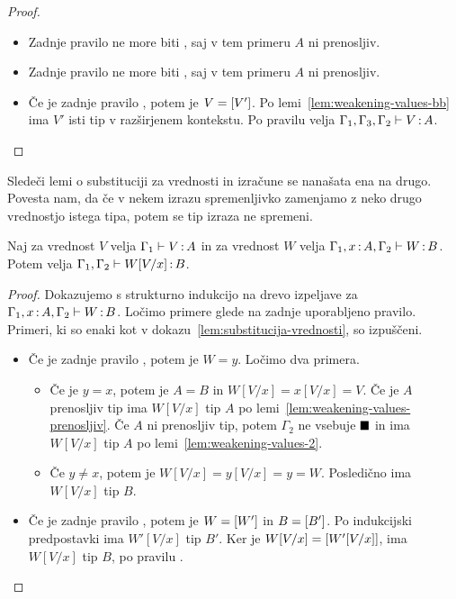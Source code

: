 \begin{proof}
\begin{itemize}
		\item Zadnje pravilo ne more biti , saj v tem primeru $A$ ni prenosljiv.
		
		\item Zadnje pravilo ne more biti , saj v tem primeru $A$ ni prenosljiv.
		
		\item Če je zadnje pravilo , potem je $V = [V']$.
		Po lemi~\ref{lem:weakening-values-bb} ima $V'$ isti tip v razširjenem kontekstu.
		Po pravilu  velja $\Gamma_1, \Gamma_3, \Gamma_2 \vdash V \mathinner{:} A$.
		
	\end{itemize}
\end{proof}

Sledeči lemi o substituciji za vrednosti in izračune se nanašata ena na drugo. Povesta nam, da če v nekem izrazu spremenljivko zamenjamo z neko drugo vrednostjo istega tipa, potem se tip izraza ne spremeni.

\begin{lema}\label{lem:substitucija-vrednosti-2}
	Naj za vrednost $V$ velja $\Gamma_1 \vdash V \mathinner{:} A$ in za vrednost $W$ velja $\Gamma_1, x \mathinner{:} A, \Gamma_2 \vdash W \mathinner{:} B$. Potem velja $\Gamma_1, \Gamma_2 \vdash W[V/x] \mathinner{:} B$.
\end{lema}

\begin{proof}
	Dokazujemo s strukturno indukcijo na drevo izpeljave za $\Gamma_1, x \mathinner{:} A, \Gamma_2 \vdash W \mathinner{:} B$.
	Ločimo primere glede na zadnje uporabljeno pravilo.
	Primeri, ki so enaki kot v dokazu~\ref{lem:substitucija-vrednosti}, so izpuščeni.
	
	\begin{itemize}
		\item Če je zadnje pravilo , potem je $W = y$.
		Ločimo dva primera.
		\begin{itemize}
			\item Če je $y = x$, potem je $A = B$ in $W[V/x] = x[V/x] = V$. Če je $A$ prenosljiv tip ima $W[V/x]$ tip $A$ po lemi~\ref{lem:weakening-values-prenosljiv}. Če $A$ ni prenosljiv tip, potem $\Gamma_2$ ne vsebuje $\blacksquare$ in ima $W[V/x]$ tip $A$ po lemi~\ref{lem:weakening-values-2}.
			
			\item Če $y \neq x$, potem je $W[V/x] = y[V/x] = y = W$. Posledično ima $W[V/x]$ tip $B$.
		\end{itemize}
		
		\item Če je zadnje pravilo , potem je $W=[W']$ in $B=[B']$. Po indukcijski predpostavki ima $W'[V/x]$ tip $B'$. Ker je $W[V/x] = [W'[V/x]]$, ima $W[V/x]$ tip $B$, po pravilu .
		
	\end{itemize}
\end{proof}


